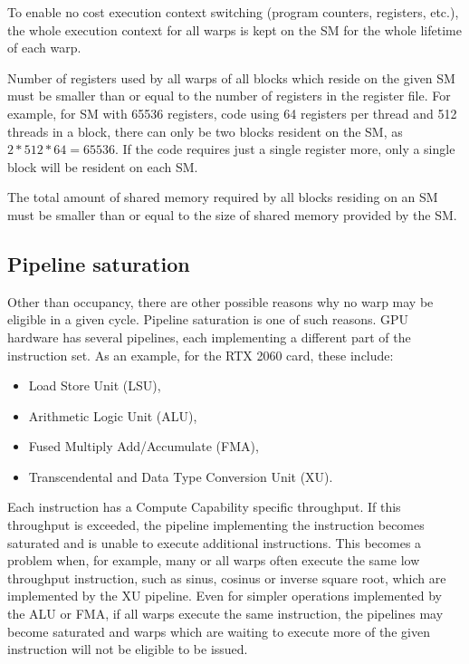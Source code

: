 To enable no cost execution context switching (program counters, registers, etc.), the whole execution context for all warps is kept on the SM for the whole lifetime of each warp. 


Number of registers used by all warps of all blocks which reside on the given SM must be smaller than or equal to the number of registers in the register file. For example, for SM with 65536 registers, code using 64 registers per thread and 512 threads in a block, there can only be two blocks resident on the SM, as $2*512*64 = 65536$. If the code requires just a single register more, only a single block will be resident on each SM.

The total amount of shared memory required by all blocks residing on an SM must be smaller than or equal to the size of shared memory provided by the SM. 

\subsection{Pipeline saturation}
\label{sec:cuda_pipelines}

Other than occupancy, there are other possible reasons why no warp may be eligible in a given cycle. Pipeline saturation is one of such reasons. GPU hardware has several pipelines, each implementing a different part of the instruction set. As an example, for the RTX 2060 card, these include\citep{site:nsight}:
\begin{itemize}
	\item Load Store Unit (LSU),
	\item Arithmetic Logic Unit (ALU),
	\item Fused Multiply Add/Accumulate (FMA),
	\item Transcendental and Data Type Conversion Unit (XU).
\end{itemize}

Each instruction has a Compute Capability specific throughput. If this throughput is exceeded, the pipeline implementing the instruction becomes saturated and is unable to execute additional instructions. This becomes a problem when, for example, many or all warps often execute the same low throughput instruction, such as sinus, cosinus or inverse square root, which are implemented by the XU pipeline. Even for simpler operations implemented by the ALU or FMA, if all warps execute the same instruction, the pipelines may become saturated and warps which are waiting to execute more of the given instruction will not be eligible to be issued.

